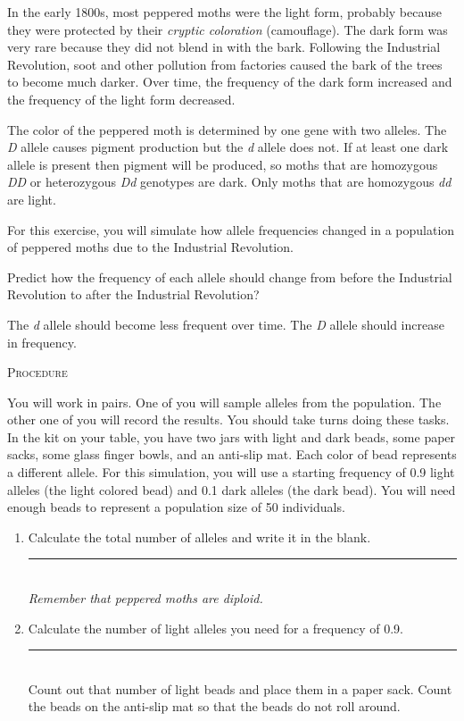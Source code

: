\documentclass[12pt]{exam}
\newcommand*\AnswerBox[2]{%
    \parbox[t][#1]{0.92\textwidth}{%
    \begin{solution}#2\end{solution}}
    \vspace*{\stretch{1}}
}
\newcommand{\allele}[1]{\textit{#1}}
\begin{document}
\begin{questions}
In the early 1800s, most peppered moths were the light form, probably because they were protected by their \emph{cryptic coloration} (camouflage). The dark form was very rare because they did not blend in with the bark. Following the Industrial Revolution, soot and other pollution from factories caused the bark of the trees to become much darker. Over time, the frequency of the dark form increased and the frequency of the light form decreased. 

The color of the peppered moth is determined by one gene with two alleles. The \allele{D} allele causes pigment production but the \allele{d} allele does not. If at least one dark allele is present then pigment will be produced, so moths that are homozygous \allele{DD} or heterozygous \allele{Dd} genotypes are dark. Only moths that are homozygous \allele{dd} are light. 

For this exercise, you will simulate how allele frequencies changed in a population of peppered moths due to the Industrial Revolution. 


\question\label{ques:prediction}
Predict how the frequency of each allele should change from before the Industrial Revolution to after the Industrial Revolution?

\AnswerBox{2\baselineskip}{The \allele{d} allele should become less frequent over time. The \allele{D} allele should increase in frequency.}

\textsc{Procedure}

\medskip

You will work in pairs. One of you will sample alleles from the population. The other one of you will record the results. You should take turns doing these tasks.  In the kit on your table, you have two jars with light and dark beads, some paper sacks, some glass finger bowls, and an anti-slip mat. Each color of bead represents a different allele. For this simulation, you will use a starting frequency of 0.9 light alleles (the light colored bead) and 0.1 dark alleles (the dark bead). You will need enough beads to represent a population size of 50 individuals.

\begin{enumerate}

	\item Calculate the total number of alleles and write it in the blank. \hfill \rule{0.5in}{0.4pt}\\ \emph{Remember that peppered moths are diploid.} 
	
	\item Calculate the number of light alleles you need for a frequency of 0.9. \hfill \rule{0.5in}{0.4pt} \\ Count out that number of light beads and place them in a paper sack. Count the beads on the anti-slip mat so that the beads do not roll around.
	

\end{enumerate}
\end{questions}
\end{document}
